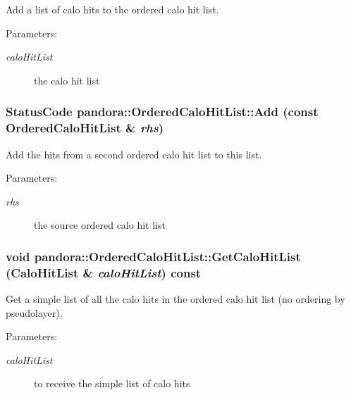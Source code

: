 Add a list of calo hits to the ordered calo hit list. 

\begin{Desc}
\item[Parameters:]
\begin{description}
\item[{\em calo\-Hit\-List}]the calo hit list \end{description}
\end{Desc}
\subsubsection{\setlength{\rightskip}{0pt plus 5cm}Status\-Code pandora::Ordered\-Calo\-Hit\-List::Add (const \bf{Ordered\-Calo\-Hit\-List} \& {\em rhs})}\label{classpandora_1_1OrderedCaloHitList_442067438bab2e925a376447b23f01c5}


Add the hits from a second ordered calo hit list to this list. 

\begin{Desc}
\item[Parameters:]
\begin{description}
\item[{\em rhs}]the source ordered calo hit list \end{description}
\end{Desc}
\subsubsection{\setlength{\rightskip}{0pt plus 5cm}void pandora::Ordered\-Calo\-Hit\-List::Get\-Calo\-Hit\-List (Calo\-Hit\-List \& {\em calo\-Hit\-List}) const}\label{classpandora_1_1OrderedCaloHitList_6b394560f2052c17437ff4d0a343cc78}


Get a simple list of all the calo hits in the ordered calo hit list (no ordering by pseudolayer). 

\begin{Desc}
\item[Parameters:]
\begin{description}
\item[{\em calo\-Hit\-List}]to receive the simple list of calo hits \end{description}
\end{Desc}
